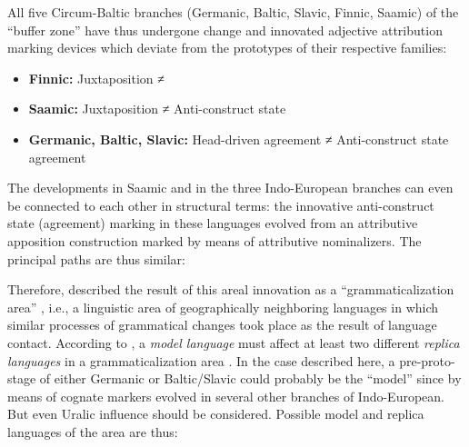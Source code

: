 All five Circum-Baltic branches (Germanic, Baltic, Slavic, Finnic, Saamic) of the “buffer zone” have thus undergone change and innovated adjective attribution marking devices which deviate from the prototypes of their respective families:
\begin{itemize}
\item	\textbf{Finnic:}
\subitem Juxtaposition ≠ 
\item	\textbf{Saamic:}
\subitem Juxtaposition ≠ Anti\hyp{}construct state
\item	\textbf{Germanic, Baltic, Slavic:}
\subitem Head\hyp{}driven agreement ≠ Anti\hyp{}construct state agreement
\end{itemize}
The developments in Saamic and in the three Indo-European branches can even be connected to each other in structural terms: the innovative anti\hyp{}construct state (agreement) marking in these languages evolved from an attributive apposition construction marked by means of attributive nominalizers. The principal  paths are thus similar:
Therefore, \citet[271]{riesler2006a} described the result of this areal innovation as a “grammaticalization area” \citep{heine-etal2005}, i.e., a linguistic area of geographically neighboring languages in which similar processes of grammatical changes took place as the result of language contact. According to \citet{heine-etal2005}, a \textit{model language} must affect at least two different \textit{replica languages} in a grammaticalization area \citep[cf. also the concept of “shared grammaticalization” by][]{robbeetsEtAl2013a}. In the case described here, a pre-proto-stage of either Germanic or Baltic\slash{}Slavic could probably be the “model” since  by means of cognate markers evolved in several other branches of Indo-European. But even Uralic influence should be considered. Possible model and replica languages of the area are thus:
